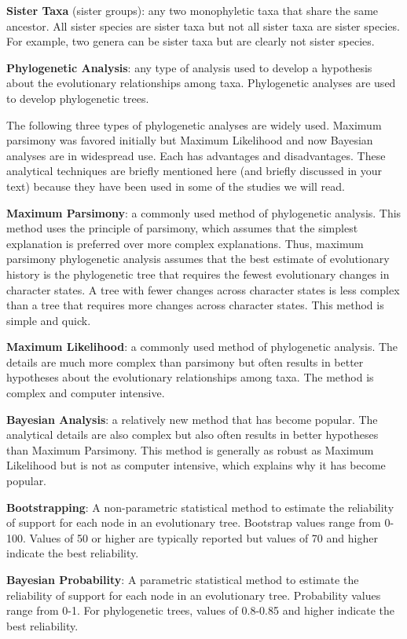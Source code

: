 \documentclass[letterpaper]{tufte-handout}
\begin{document}
\noindent\textbf{Sister Taxa} (sister groups): any two monophyletic taxa that share the same ancestor. All sister species are sister taxa but not all sister taxa are sister species. For example, two genera can be sister taxa but are clearly not sister species.

\noindent\textbf{Phylogenetic Analysis}: any type of analysis used to develop a hypothesis about the evolutionary relationships among taxa.  Phylogenetic analyses are used to develop phylogenetic trees. 

The following three types of phylogenetic analyses are widely used. Maximum parsimony was favored initially but Maximum Likelihood and now Bayesian analyses are in widespread use. Each has advantages and disadvantages. These analytical techniques are briefly mentioned here (and briefly discussed in your text) because they have been used in some of the studies we will read.

\noindent\textbf{Maximum Parsimony}: a commonly used method of phylogenetic analysis.  This method uses the principle of parsimony, which assumes that the simplest explanation is preferred over more complex explanations.  Thus, maximum parsimony phylogenetic analysis assumes that the best estimate of evolutionary history is the phylogenetic tree that requires the fewest evolutionary changes in character states. A tree with fewer changes across character states is less complex than a tree that requires more changes across character states.  This method is simple and quick.

\noindent\textbf{Maximum Likelihood}: a commonly used method of phylogenetic analysis. The details are much more complex than parsimony but often results in better hypotheses about the evolutionary relationships among taxa. The method is complex and computer intensive. 

\noindent\textbf{Bayesian Analysis}: a relatively new method that has become popular. The analytical details are also complex but also often results in better hypotheses than Maximum Parsimony. This method is generally as robust as Maximum Likelihood but is not as computer intensive, which explains why it has become popular.

\noindent\textbf{Bootstrapping}: A non-parametric statistical method to estimate the reliability of support for each node in an evolutionary tree.  Bootstrap values range from 0-100. Values of 50 or higher are typically reported but values of 70 and higher indicate the best reliability. 

\noindent\textbf{Bayesian Probability}: A parametric statistical method to estimate the reliability of support for each node in an evolutionary tree.  Probability values range from 0-1. For phylogenetic trees, values of 0.8-0.85 and higher indicate the best reliability. 
\end{document}
